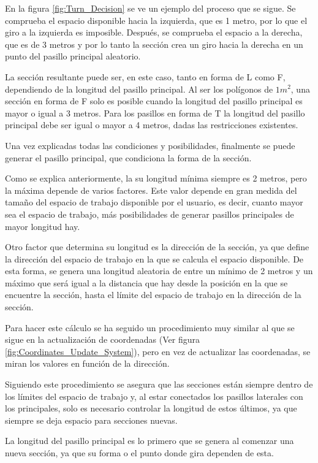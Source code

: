 \documentclass[../main.tex]{subfiles}
\begin{document}
En la figura \ref{fig:Turn_Decision} se ve un ejemplo del proceso que se sigue. Se comprueba el espacio disponible hacia la izquierda, que es 1 metro, por lo que el giro a la izquierda es imposible. Después, se comprueba el espacio a la derecha, que es de 3 metros y por lo tanto la sección crea un giro hacia la derecha en un punto del pasillo principal aleatorio.

La sección resultante puede ser, en este caso, tanto en forma de L como F, dependiendo de la longitud del pasillo principal. Al ser los polígonos de $1m^2$, una sección en forma de F solo es posible cuando la longitud del pasillo principal es mayor o igual a 3 metros. Para los pasillos en forma de T la longitud del pasillo principal debe ser igual o mayor a 4 metros, dadas las restricciones existentes.

Una vez explicadas todas las condiciones y posibilidades, finalmente se puede generar el pasillo principal, que condiciona la forma de la sección. 

Como se explica anteriormente, la su longitud mínima siempre es 2 metros, pero la máxima depende de varios factores. Este valor depende en gran medida del tamaño del espacio de trabajo disponible por el usuario, es decir, cuanto mayor sea el espacio de trabajo, más posibilidades de generar pasillos principales de mayor longitud hay.

Otro factor que determina su longitud es la dirección de la sección, ya que define la dirección del espacio de trabajo en la que se calcula el espacio disponible. De esta forma, se genera una longitud aleatoria de entre un mínimo de 2 metros y un máximo que será igual a la distancia que hay desde la posición en la que se encuentre la sección, hasta el límite del espacio de trabajo en la dirección de la sección.

Para hacer este cálculo se ha seguido un procedimiento muy similar al que se sigue en la actualización de coordenadas (Ver figura \ref{fig:Coordinates_Update_System}), pero en vez de actualizar las coordenadas, se miran los valores en función de la dirección.

Siguiendo este procedimiento se asegura que las secciones están siempre dentro de los límites del espacio de trabajo y, al estar conectados los pasillos laterales con los principales, solo es necesario controlar la longitud de estos últimos, ya que siempre se deja espacio para secciones nuevas.

La longitud del pasillo principal es lo primero que se genera al comenzar una nueva sección, ya que su forma o el punto donde gira dependen de esta.
\end{document}
